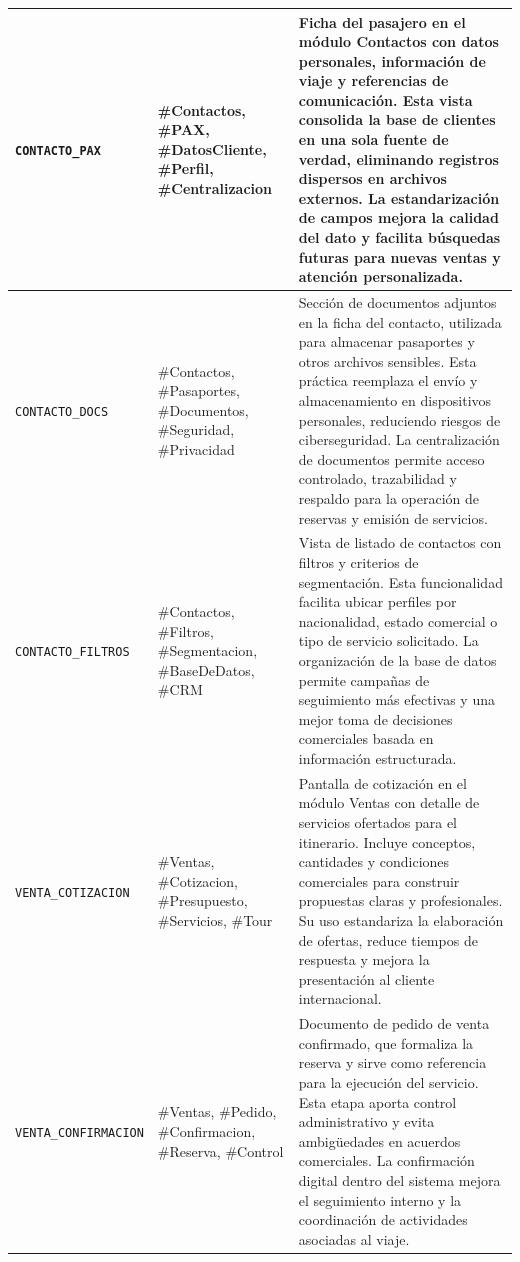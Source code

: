 \documentclass[11pt,a4paper]{article}
\begin{document}
\begin{longtable}{|>{\centering\arraybackslash}m{}|>{\RaggedRight\arraybackslash}m{}|>{\RaggedRight\arraybackslash}m{}|}
\texttt{CONTACTO\_PAX}
&
\#Contactos, \#PAX, \#DatosCliente, \#Perfil, \#Centralizacion
&
Ficha del pasajero en el módulo Contactos con datos personales, información de viaje y referencias de comunicación. Esta vista consolida la base de clientes en una sola fuente de verdad, eliminando registros dispersos en archivos externos. La estandarización de campos mejora la calidad del dato y facilita búsquedas futuras para nuevas ventas y atención personalizada.
\\ \hline

\texttt{CONTACTO\_DOCS}
&
\#Contactos, \#Pasaportes, \#Documentos, \#Seguridad, \#Privacidad
&
Sección de documentos adjuntos en la ficha del contacto, utilizada para almacenar pasaportes y otros archivos sensibles. Esta práctica reemplaza el envío y almacenamiento en dispositivos personales, reduciendo riesgos de ciberseguridad. La centralización de documentos permite acceso controlado, trazabilidad y respaldo para la operación de reservas y emisión de servicios.
\\ \hline

\texttt{CONTACTO\_FILTROS}
&
\#Contactos, \#Filtros, \#Segmentacion, \#BaseDeDatos, \#CRM
&
Vista de listado de contactos con filtros y criterios de segmentación. Esta funcionalidad facilita ubicar perfiles por nacionalidad, estado comercial o tipo de servicio solicitado. La organización de la base de datos permite campañas de seguimiento más efectivas y una mejor toma de decisiones comerciales basada en información estructurada.
\\ \hline

\texttt{VENTA\_COTIZACION}
&
\#Ventas, \#Cotizacion, \#Presupuesto, \#Servicios, \#Tour
&
Pantalla de cotización en el módulo Ventas con detalle de servicios ofertados para el itinerario. Incluye conceptos, cantidades y condiciones comerciales para construir propuestas claras y profesionales. Su uso estandariza la elaboración de ofertas, reduce tiempos de respuesta y mejora la presentación al cliente internacional.
\\ \hline

\texttt{VENTA\_CONFIRMACION}
&
\#Ventas, \#Pedido, \#Confirmacion, \#Reserva, \#Control
&
Documento de pedido de venta confirmado, que formaliza la reserva y sirve como referencia para la ejecución del servicio. Esta etapa aporta control administrativo y evita ambigüedades en acuerdos comerciales. La confirmación digital dentro del sistema mejora el seguimiento interno y la coordinación de actividades asociadas al viaje.
\\ \hline


\end{longtable}
\end{document}

